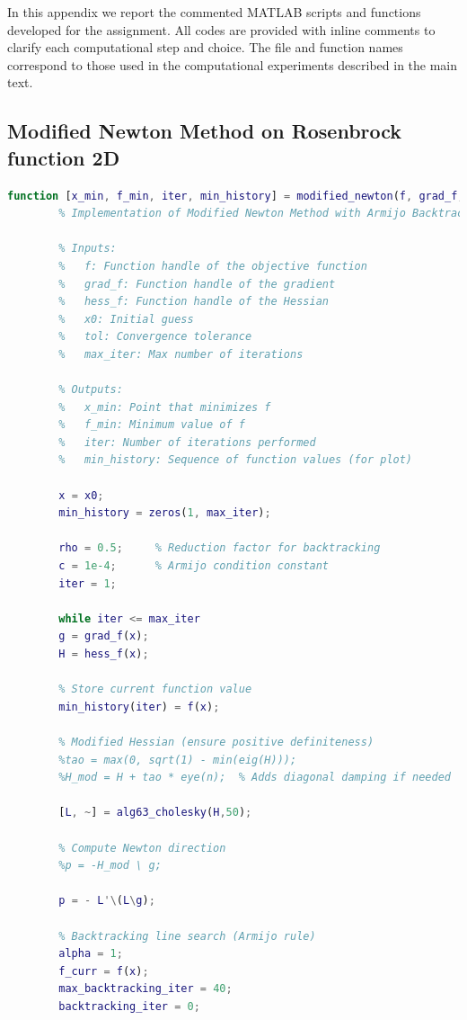 \documentclass[a4paper,12pt]{article}
\begin{document}
	In this appendix we report the commented MATLAB scripts and functions developed for the assignment. All codes are provided with inline comments to clarify each computational step and choice. The file and function names correspond to those used in the computational experiments described in the main text.
	
	\subsection*{Modified Newton Method on Rosenbrock function 2D}
	
	\begin{lstlisting}[language=Matlab,caption={Modified Newton Method with Armijo Backtracking Line Search},label={lst:modified-newton}]
		function [x_min, f_min, iter, min_history] = modified_newton(f, grad_f, hess_f, x0, tol, max_iter,name)
		% Implementation of Modified Newton Method with Armijo Backtracking Line Search
		
		% Inputs:
		%   f: Function handle of the objective function
		%   grad_f: Function handle of the gradient
		%   hess_f: Function handle of the Hessian
		%   x0: Initial guess
		%   tol: Convergence tolerance
		%   max_iter: Max number of iterations
		
		% Outputs:
		%   x_min: Point that minimizes f
		%   f_min: Minimum value of f
		%   iter: Number of iterations performed
		%   min_history: Sequence of function values (for plot)
		
		x = x0;
		min_history = zeros(1, max_iter);
		
		rho = 0.5;     % Reduction factor for backtracking
		c = 1e-4;      % Armijo condition constant
		iter = 1;
		
		while iter <= max_iter
		g = grad_f(x);
		H = hess_f(x);
		
		% Store current function value
		min_history(iter) = f(x);
		
		% Modified Hessian (ensure positive definiteness)
		%tao = max(0, sqrt(1) - min(eig(H)));
		%H_mod = H + tao * eye(n);  % Adds diagonal damping if needed
		
		[L, ~] = alg63_cholesky(H,50); 
		
		% Compute Newton direction
		%p = -H_mod \ g;
		
		p = - L'\(L\g);
		
		% Backtracking line search (Armijo rule)
		alpha = 1;
		f_curr = f(x);
		max_backtracking_iter = 40; 
		backtracking_iter = 0;
		

\end{lstlisting}
\end{document}
